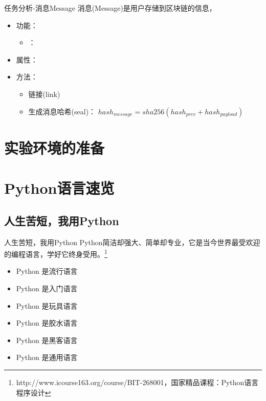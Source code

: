 \documentclass[11pt]{beamer}
\begin{document}
\begin{frame}{任务分析-消息Message}
	消息(Message)是用户存储到区块链的信息，
	\begin{itemize}
		\item 功能：
		\begin{itemize}
			\item ：
		\end{itemize}
		\item 属性：
		\item 方法：
		\begin{itemize}
			\item  链接(link)
			\item 生成消息哈希(seal)：			
				$hash_{message}=sha256(hash_{prev} + hash_{payload})$
		\end{itemize}
	\end{itemize}
\end{frame}

\section{实验环境的准备}

\section{Python语言速览}
\subsection{人生苦短，我用Python}
\begin{frame}{人生苦短，我用Python}
	Python简洁却强大、简单却专业，它是当今世界最受欢迎的编程语言，学好它终身受用。\footnote{http://www.icourse163.org/course/BIT-268001，国家精品课程：Python语言程序设计}
	\begin{multicols}{2}
			\begin{itemize}
			\item	Python 是流行语言
			\item	Python 是入门语言
			\item	Python 是玩具语言
			\item	Python 是胶水语言
			\item	Python 是黑客语言
			\item	Python 是通用语言
		\end{itemize}
	\end{multicols}
\end{frame}
\end{document}
